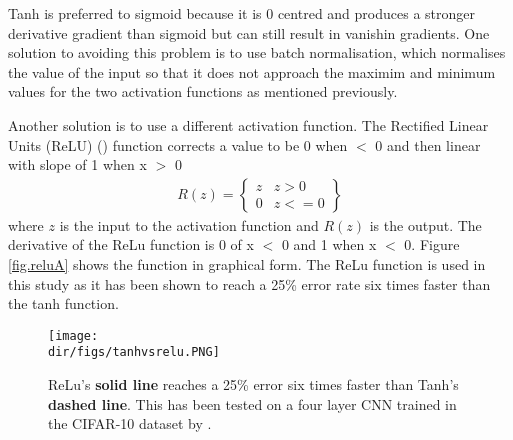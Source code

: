 Tanh is preferred to sigmoid because it is 0 centred and produces a stronger derivative gradient than sigmoid but can still result in vanishin gradients. One solution to avoiding this problem is to use batch normalisation, which normalises the value of the input so that it does not approach the maximim and minimum values for the two activation functions as mentioned previously.
\par
Another solution is to use a different activation function. The Rectified Linear Units (ReLU) (\cite{krizhevsky17, nair10}) function corrects a value to be 0 when $<$ 0 and then linear with slope of 1 when x $>$ 0
\[\begin{split}R(z) = \begin{Bmatrix} z & z > 0 \\
 0 & z <= 0 \end{Bmatrix}\end{split}\]
 where $z$ is the input to the activation function and $R(z)$ is the output. The derivative of the ReLu function is 0  of x $<$ 0 and 1 when x $<$ 0. Figure \ref{fig.reluA} shows the function in graphical form. The ReLu function is used in this study as it has been shown to reach a 25\% error rate six times faster than the tanh function.
 \begin{figure}
     \centering
     \texttt{[image: \\dir/figs/tanhvsrelu.PNG]}
     \caption[Relu Activation Function Versus Tanh]{ReLu's \textbf{solid line} reaches a 25\% error six times faster than Tanh's \textbf{dashed line}. This has been tested on a four layer CNN trained in the CIFAR-10 dataset by \citet{krizhevsky17}.}
     \label{fig.tanhvsrelu}
 \end{figure}
